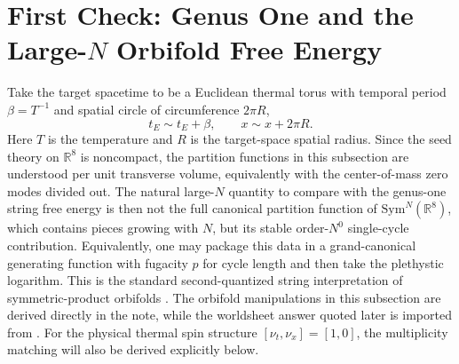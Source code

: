 \documentclass[11pt]{article}
\newcommand{\Sym}{\mathrm{Sym}}
\newcommand{\bR}{\mathbb{R}}
\begin{document}
\section[First Check: Genus One and Large-N Orbifold Free Energy]{First Check: Genus One and the Large-$N$ Orbifold Free Energy}
Take the target spacetime to be a Euclidean thermal torus with temporal period $\beta=T^{-1}$ and spatial circle of circumference $2\pi R$,
\begin{equation}\label{eq:thermal-target}
t_E\sim t_E+\beta,
\qquad
x\sim x+2\pi R.
\end{equation}
Here $T$ is the temperature and $R$ is the target-space spatial radius. Since the seed theory on $\bR^8$ is noncompact, the partition functions in this subsection are understood per unit transverse volume, equivalently with the center-of-mass zero modes divided out. The natural large-$N$ quantity to compare with the genus-one string free energy is then not the full canonical partition function of $\Sym^N(\bR^8)$, which contains pieces growing with $N$, but its stable order-$N^0$ single-cycle contribution. Equivalently, one may package this data in a grand-canonical generating function with fugacity $p$ for cycle length and then take the plethystic logarithm. This is the standard second-quantized string interpretation of symmetric-product orbifolds \cite{dijkgraaf1997ellipticgenerasymmetricproducts}. The orbifold manipulations in this subsection are derived directly in the note, while the worldsheet answer quoted later is imported from \cite{gomis2000nonrelativisticclosedstringtheory}. For the physical thermal spin structure $[\nu_t,\nu_x]=[1,0]$, the multiplicity matching will also be derived explicitly below.
\end{document}

